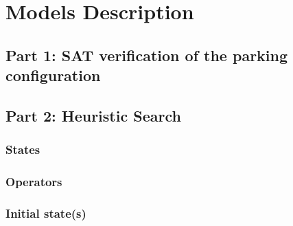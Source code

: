 \chapter{Models Description}
\label{chapter: models description}









\section{Part 1: SAT verification of the parking configuration}

\paragraph{}


\section{Part 2: Heuristic Search}

\subsection{States}

\paragraph{}

\subsection{Operators}

\paragraph{}

\subsection{Initial state(s)}

\paragraph{}


